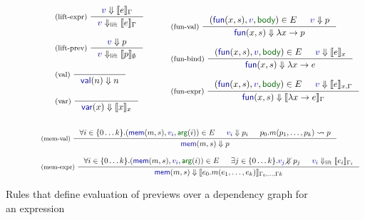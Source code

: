 \documentclass[acmsmall,anonymous,fleqn]{acmart}\settopmatter{printfolios=false,printccs=false,printacmref=false}
\theoremstyle{plain}
\theoremstyle{definition}
\newcommand{\ident}[1]{\textnormal{\textcolor{idclr}{\sffamily #1}}}
\newcommand{\bndclr}[1]{\textcolor{kvdclr}{#1}}
\newcommand{\bnd}[1]{\textnormal{\textcolor{kvdclr}{\sffamily #1}}}
\newcommand{\blbl}[1]{\textnormal{\textcolor{numclr}{\sffamily #1}}}
\begin{document}
\begin{figure}
\begin{equation*}
\qquad\qquad\quad\begin{array}{l}
\inference[(lift-expr)~]
  {\bndclr{v} \Downarrow \llbracket e \rrbracket_\Gamma}
  {\bndclr{v} \Downarrow_{\ident{lift}} \llbracket e \rrbracket_\Gamma}
\\
\\
\inference[(lift-prev)~]
  {\bndclr{v} \Downarrow p}
  {\bndclr{v} \Downarrow_{\ident{lift}} \llbracket p \rrbracket_\emptyset}
\\
\\
\inference[(val)~]
  {~}
  {\bnd{val}(n) \Downarrow n }
\\
\\
\inference[(var)~]
  {~}
  {\bnd{var}(x) \Downarrow \llbracket x \rrbracket_x}
  \\[0.5em]~
\end{array}
\qquad
\begin{array}{l}
\inference[(fun-val)~]
  { (\bnd{fun}(x, s), \bndclr{v}, \blbl{body}) \in E & \bndclr{v} \Downarrow p }
  { \bnd{fun}(x, s) \Downarrow \lambda x\rightarrow p }
\\
\\
\inference[(fun-bind)~]
  { (\bnd{fun}(x, s), \bndclr{v}, \blbl{body}) \in E & \bndclr{v} \Downarrow \llbracket e \rrbracket_{x} }
  { \bnd{fun}(x, s) \Downarrow \lambda x\rightarrow e }
\\
\\
\inference[(fun-expr)~]
  { (\bnd{fun}(x, s), \bndclr{v}, \blbl{body}) \in E & \bndclr{v} \Downarrow \llbracket e \rrbracket_{x,\Gamma} }
  { \bnd{fun}(x, s) \Downarrow \llbracket \lambda x\rightarrow e \rrbracket_\Gamma }
\\[0.5em]~
\end{array}
\end{equation*}
\begin{equation*}
\qquad\qquad\begin{array}{l}
\inference[(mem-val)~]
  { \forall i\in\{0\ldots k\}.(\bnd{mem}(m, s), \bndclr{v_i}, \blbl{arg}(i)) \in E & \bndclr{v_i} \Downarrow p_i
    & p_0.m(p_1, \ldots, p_k) \rightsquigarrow p }
  { \bnd{mem}(m, s) \Downarrow p }
\\
\\
\inference[(mem-expr)~]
  { \forall i\in\{0\ldots k\}.(\bnd{mem}(m, s), \bndclr{v_i}, \blbl{arg}(i)) \in E & \exists j\in\{0\ldots k\}.\bndclr{v_j}\diagup\hspace{-1em}\Downarrow p_j
   & \bndclr{v_i} \Downarrow_{\ident{lift}} \llbracket e_i \rrbracket_{\Gamma_i}  }
  { \bnd{mem}(m, s) \Downarrow \llbracket e_0.m(e_1, \ldots, e_k) \rrbracket_{\Gamma_0,\ldots,\Gamma k} }
\\
\end{array}
\end{equation*}

\caption{Rules that define evaluation of previews over a dependency graph for an expression}
\label{fig:eval}
\end{figure}
\end{document}
